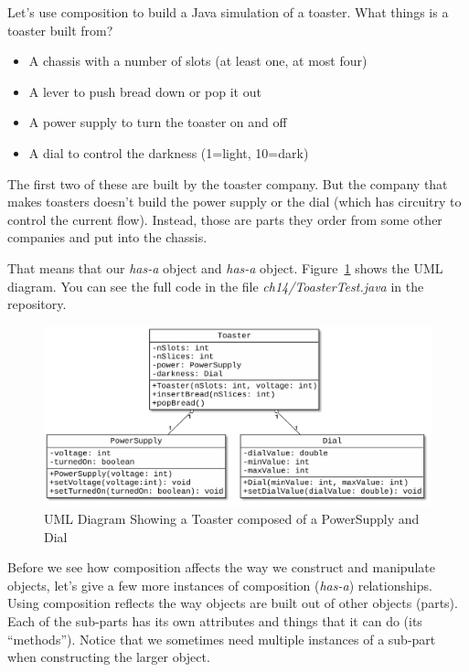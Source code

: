 Let's use composition to build a Java simulation of a toaster. What things is a toaster built from?

\begin{itemize}
\item A chassis with a number of slots (at least one, at most four)
\item A lever to push bread down or pop it out
\item A power supply to turn the toaster on and off
\item A dial to control the darkness (1=light, 10=dark)
\end{itemize}

The first two of these are built by the toaster company. But the company that makes toasters doesn't build the power supply or the dial (which has circuitry to control the current flow). Instead, those are parts they order from some other companies and put into the chassis.

That means that our  {\em has-a}  object and {\em has-a}  object. Figure~\ref{fig.toasterComposition} shows the UML diagram. You can see the full code in the file {\em ch14/ToasterTest.java} in the repository.

\begin{figure}[!ht]
\begin{center}
\includegraphics[scale=0.5]{figs/ch14/toaster.pdf}
\caption{UML Diagram Showing a Toaster composed of a PowerSupply and Dial}
\label{fig.toasterComposition}
\end{center}
\end{figure}

Before we see how composition affects the way we construct and manipulate objects, let's give a few more instances of composition ({\em has-a}) relationships. Using composition reflects the way objects are built out of other objects (parts). Each of the sub-parts has its own attributes and things that it can do (its ``methods''). Notice that we sometimes need multiple instances of a sub-part when constructing the larger object.


